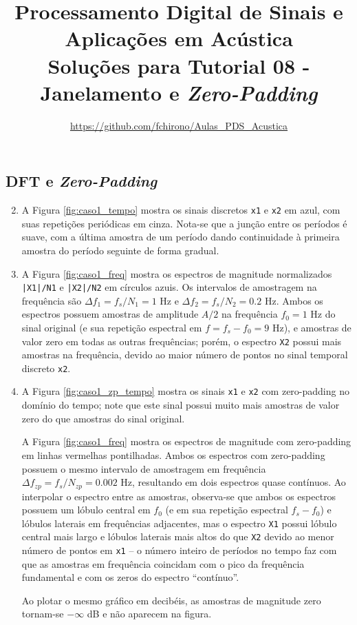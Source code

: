 \documentclass[a4paper,twoside,12pt]{article}
\title{\vspace{-2cm} Processamento Digital de Sinais e Aplicações em Acústica\\ Soluções para Tutorial 08 - Janelamento e \emph{Zero-Padding}}
\author{\url{https://github.com/fchirono/Aulas_PDS_Acustica}}
\begin{document}
	\date{}
	\maketitle

\setcounter{section}{2}

\subsection{DFT e \emph{Zero-Padding}}

\begin{enumerate}
	\setcounter{enumi}{1}
	\item A Figura \ref{fig:caso1_tempo} mostra os sinais discretos \texttt{x1} e \texttt{x2} em azul, com suas repetições periódicas em cinza. Nota-se que a junção entre os períodos é suave, com a última amostra de um período dando continuidade à primeira amostra do período seguinte de forma gradual.
	
	\item A Figura \ref{fig:caso1_freq} mostra os espectros de magnitude normalizados \texttt{|X1|/N1} e \texttt{|X2|/N2} em círculos azuis. Os intervalos de amostragem na frequência são $\Delta f_1 = f_s / N_1 = 1$ Hz e $\Delta f_2 = f_s / N_2 = 0.2$ Hz. Ambos os espectros possuem amostras de amplitude $A/2$ na frequência $f_0 = 1$ Hz do sinal original (e sua repetição espectral em $f = f_s - f_0 = 9$ Hz), e amostras de valor zero em todas as outras frequências; porém, o espectro \texttt{X2} possui mais amostras na frequência, devido ao maior número de pontos no sinal temporal discreto \texttt{x2}.
	
	\item A Figura \ref{fig:caso1_zp_tempo} mostra os sinais \texttt{x1} e \texttt{x2} com zero-padding no domínio do tempo; note que este sinal possui muito mais amostras de valor zero do que amostras do sinal original.
	
	A Figura \ref{fig:caso1_freq} mostra os espectros de magnitude com zero-padding em linhas vermelhas pontilhadas. Ambos os espectros com zero-padding possuem o mesmo intervalo de amostragem em frequência $\Delta f_{zp} = f_s / N_{zp} = 0.002$ Hz, resultando em dois espectros quase contínuos. Ao interpolar o espectro entre as amostras, observa-se que ambos os espectros possuem um lóbulo central em $f_0$ (e em sua repetição espectral $f_s-f_0$) e lóbulos laterais em frequências adjacentes, mas o espectro \texttt{X1} possui lóbulo central mais largo e lóbulos laterais mais altos do que \texttt{X2} devido ao menor número de pontos em \texttt{x1} -- o número inteiro de períodos no tempo faz com que as amostras em frequência coincidam com o pico da frequência fundamental e com os zeros do espectro ``contínuo''.
	
	Ao plotar o mesmo gráfico em decibéis, as amostras de magnitude zero tornam-se $-\infty$ dB e não aparecem na figura. 
\end{enumerate}
\end{document}
